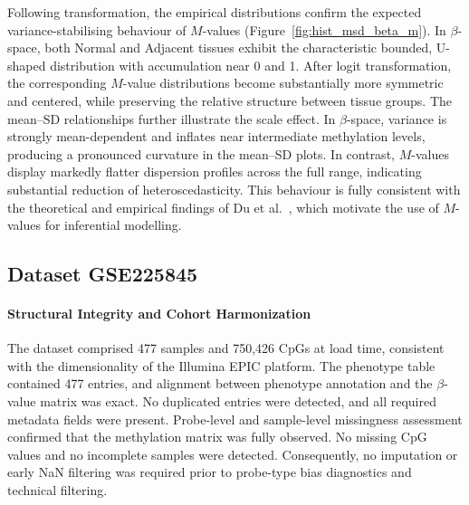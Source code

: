 Following transformation, the empirical distributions confirm the expected variance-stabilising behaviour of $M$-values (Figure~\ref{fig:hist_msd_beta_m}). In $\beta$-space, both Normal and Adjacent tissues exhibit the characteristic bounded, U-shaped distribution with accumulation near 0 and 1. After logit transformation, the corresponding $M$-value distributions become substantially more symmetric and centered, while preserving the relative structure between tissue groups.
The mean–SD relationships further illustrate the scale effect. In $\beta$-space, variance is strongly mean-dependent and inflates near intermediate methylation levels, producing a pronounced curvature in the mean–SD plots. In contrast, $M$-values display markedly flatter dispersion profiles across the full range, indicating substantial reduction of heteroscedasticity. 
This behaviour is fully consistent with the theoretical and empirical findings of Du et al.~\cite{Du2010}, which motivate the use of $M$-values for inferential modelling.



\subsection{Dataset GSE225845}
\label{subsec:gse225845_preproc}

\paragraph{Structural Integrity and Cohort Harmonization}
\label{par:gse225845_step0}

The dataset comprised 477 samples and 750{,}426 CpGs at load time, consistent with the dimensionality of the Illumina EPIC platform.  
The phenotype table contained 477 entries, and alignment between phenotype annotation and the $\beta$-value matrix was exact. No duplicated entries were detected, and all required metadata fields were present.
Probe-level and sample-level missingness assessment confirmed that the methylation matrix was fully observed.  
No missing CpG values and no incomplete samples were detected. Consequently, no imputation or early NaN filtering was required prior to probe-type bias diagnostics and technical filtering.


